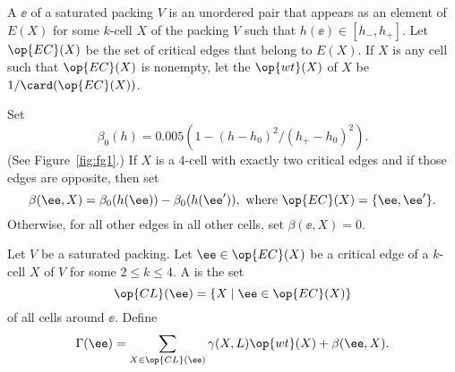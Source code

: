 

\begin{definition}\label{def:wt} 
  A  $\ee$ of a saturated packing $V$ is an
  unordered pair that appears as an element of $E(X)$ for some
  $k$-cell $X$ of the packing $V$ such that $h(\ee)\in[h_-,h_+]$.  Let
  $\op{EC}(X)$ be the set of critical edges that belong to $E(X)$.  If
  $X$ is any cell such that $\op{EC}(X)$ is nonempty, let the
   $\op{wt}(X)$ of $X$ be $1/\card(\op{EC}(X))$.
\end{definition}
%
%

\begin{definition}\label{def:beta} 
Set 
\[  
\beta_0(h) = 0.005 (1 - (h-h_0)^2/(h_+-h_0)^2).
\] 
 (See Figure~\ref{fig:fg1}.) 
If $X$ is a $4$-cell with exactly two critical edges and if those
edges are opposite, then set
\[  
\beta(\ee,X) = \beta_0(h(\ee)) - \beta_0(h(\ee')), 
\text{ where }\op{EC}(X) = \{\ee,\ee'\} .  
\] 
Otherwise, for all other edges in all other cells, set $\beta(\ee,X) = 0$.
\end{definition}
%

\figPQFEXQN %

\begin{definition}
\label{def:gammaL} 
  Let $V$ be a saturated packing.  Let $\ee\in \op{EC}(X)$ be a
  critical edge of a $k$-cell $X$ of $V$ for some $2\le k\le 4$.  A
   is the set
\[  
\op{CL}(\ee) = \{X\mid \ee\in \op{EC}(X)\} 
\] 
%
of all cells around $\ee$. 
Define
\[  
\Gamma(\ee) = \sum_{X\in \op{CL}(\ee)} \gamma(X,L) \op{wt}(X) +\beta(\ee,X).
\] 
\end{definition}
%
%
%


